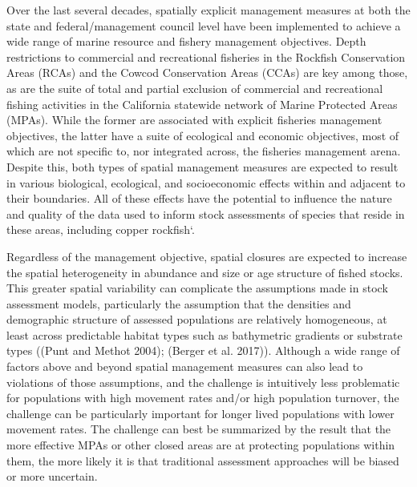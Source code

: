 \documentclass[11pt,
  english,
  letterpaper,
]{article}
\begin{document}
Over the last several decades, spatially explicit management measures at both the state and federal/management council level have been implemented to achieve a wide range of marine resource and fishery management objectives. Depth restrictions to commercial and recreational fisheries in the Rockfish Conservation Areas (RCAs) and the Cowcod Conservation Areas (CCAs) are key among those, as are the suite of total and partial exclusion of commercial and recreational fishing activities in the California statewide network of Marine Protected Areas (MPAs). While the former are associated with explicit fisheries management objectives, the latter have a suite of ecological and economic objectives, most of which are not specific to, nor integrated across, the fisheries management arena. Despite this, both types of spatial management measures are expected to result in various biological, ecological, and socioeconomic effects within and adjacent to their boundaries. All of these effects have the potential to influence the nature and quality of the data used to inform stock assessments of species that reside in these areas, including copper rockfish`.

Regardless of the management objective, spatial closures are expected to increase the spatial heterogeneity in abundance and size or age structure of fished stocks. This greater spatial variability can complicate the assumptions made in stock assessment models, particularly the assumption that the densities and demographic structure of assessed populations are relatively homogeneous, at least across predictable habitat types such as bathymetric gradients or substrate types ((Punt and Methot 2004); (Berger et al. 2017)). Although a wide range of factors above and beyond spatial management measures can also lead to violations of those assumptions, and the challenge is intuitively less problematic for populations with high movement rates and/or high population turnover, the challenge can be particularly important for longer lived populations with lower movement rates. The challenge can best be summarized by the result that the more effective MPAs or other closed areas are at protecting populations within them, the more likely it is that traditional assessment approaches will be biased or more uncertain.
\end{document}
